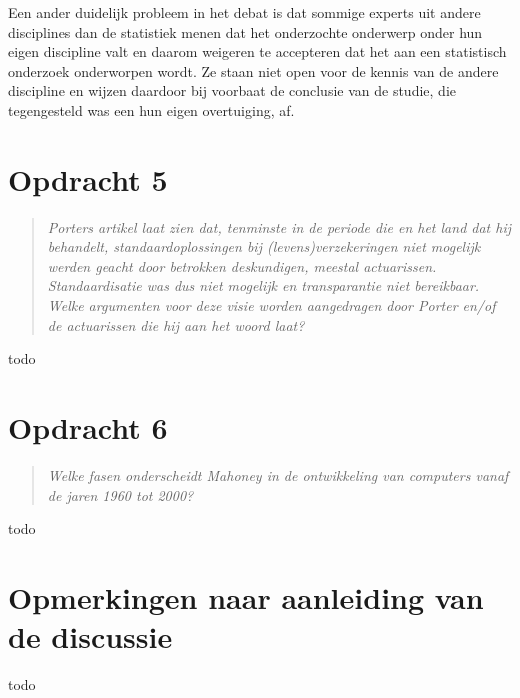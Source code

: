 \documentclass[a4paper,11pt]{article}
\begin{document}
Een ander duidelijk probleem in het debat is dat sommige experts uit andere
disciplines dan de statistiek menen dat het onderzochte onderwerp onder hun
eigen discipline valt en daarom weigeren te accepteren dat het aan een
statistisch onderzoek onderworpen wordt. Ze staan niet open voor de kennis van
de andere discipline en wijzen daardoor bij voorbaat de conclusie van de
studie, die tegengesteld was een hun eigen overtuiging, af.


\section*{Opdracht 5}


\begin{quote}
\emph{Porters artikel laat zien dat, tenminste in de periode die en het land
  dat hij behandelt, standaardoplossingen bij (levens)verzekeringen niet
  mogelijk werden geacht door betrokken deskundigen, meestal
  actuarissen. Standaardisatie was dus niet mogelijk en transparantie niet
  bereikbaar. Welke argumenten voor deze visie worden aangedragen door Porter
  en/of de actuarissen die hij aan het woord laat?}
\end{quote}


todo


\section*{Opdracht 6}


\begin{quote}
\emph{Welke fasen onderscheidt Mahoney in de ontwikkeling van computers vanaf
  de jaren 1960 tot 2000?}
\end{quote}


todo


\section*{Opmerkingen naar aanleiding van de discussie}


todo
\end{document}
